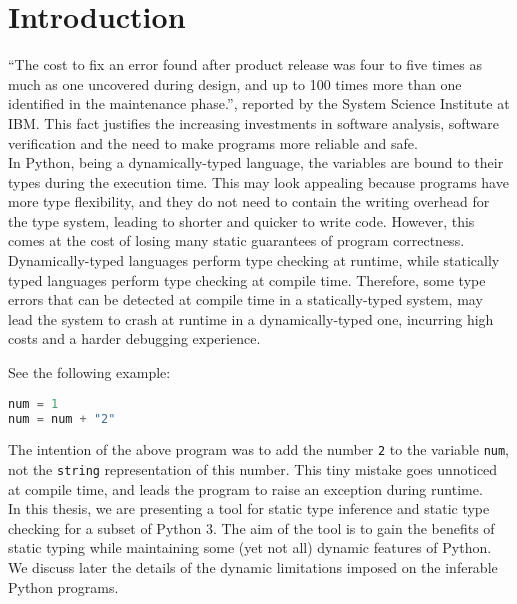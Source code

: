 
\chapter{Introduction}\label{chapter:introduction}

“The cost to fix an error found after product release was four to five times as much as one uncovered during design, and up to 100 times more than one identified in the maintenance phase.”, reported by the System Science Institute at IBM. This fact justifies the increasing investments in software analysis, software verification and the need to make programs more reliable and safe.\\

In Python, being a dynamically-typed language, the variables are bound to their types during the execution time. This may look appealing because programs have more type flexibility, and they do not need to contain the writing overhead for the type system, leading to shorter and quicker to write code. However, this comes at the cost of losing many static guarantees of program correctness. Dynamically-typed languages perform type checking at runtime, while statically typed languages perform type checking at compile time. Therefore, some type errors that can be detected at compile time in a statically-typed system, may lead the system to crash at runtime in a dynamically-typed one, incurring high costs and a harder debugging experience.

See the following example:

\begin{lstlisting}[language=python]
num = 1
num = num + "2"
\end{lstlisting}



The intention of the above program was to add the number \lstinline|2| to the variable \lstinline|num|, not the \lstinline|string| representation of this number. This tiny mistake goes unnoticed at compile time, and leads the program to raise an exception during runtime.\\

In this thesis, we are presenting a tool for static type inference and static type checking for a subset of Python 3. The aim of the tool is to gain the benefits of static typing while maintaining some (yet not all) dynamic features of Python. We discuss later the details of the dynamic limitations imposed on the inferable Python programs.\\

